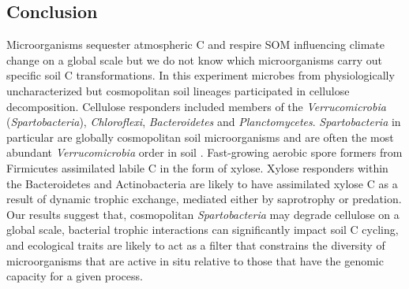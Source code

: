 \subsection{Conclusion} 
Microorganisms sequester atmospheric C and respire SOM influencing climate
change on a global scale but we do not know which microorganisms carry out
specific soil C transformations. In this experiment microbes from
physiologically uncharacterized but cosmopolitan soil lineages participated in
cellulose decomposition. Cellulose responders included members of the
\textit{Verrucomicrobia} (\textit{Spartobacteria}), \textit{Chloroflexi},
\textit{Bacteroidetes} and \textit{Planctomycetes}. \textit{Spartobacteria} in
particular are globally cosmopolitan soil microorganisms and are often the most
abundant \textit{Verrucomicrobia} order in soil \citep{Bergmann_2011}.
Fast-growing aerobic spore formers from Firmicutes assimilated labile C in the
form of xylose. Xylose responders within the Bacteroidetes and Actinobacteria
are likely to have assimilated xylose C as a result of dynamic trophic
exchange, mediated either by saprotrophy or predation. Our results suggest
that, cosmopolitan \textit{Spartobacteria} may degrade cellulose on a global
scale, bacterial trophic interactions can significantly impact soil C cycling,
and ecological traits are likely to act as a filter that constrains the
diversity of microorganisms that are active in situ relative to those that have
the genomic capacity for a given process.
